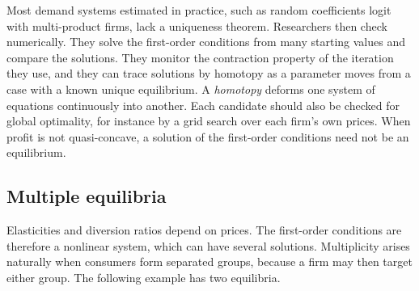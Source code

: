 Most demand systems estimated in practice, such as random coefficients logit with multi-product firms, lack a
uniqueness theorem. Researchers then check numerically. They solve the first-order conditions from many starting
values and compare the solutions. They monitor the contraction property of the iteration they use, and they can
trace solutions by homotopy as a parameter moves from a case with a known unique equilibrium. A \emph{homotopy}
deforms one system of equations continuously into another. Each candidate should
also be checked for global optimality, for instance by a grid search over each firm's own prices. When profit is
not quasi-concave, a solution of the first-order conditions need not be an equilibrium.

\subsection{Multiple equilibria}\label{sec:04-multiple}

Elasticities and diversion ratios depend on prices. The first-order conditions are therefore a nonlinear system,
which can have several solutions. Multiplicity arises naturally when consumers form separated groups, because a firm
may then target either group. The following example has two equilibria.

